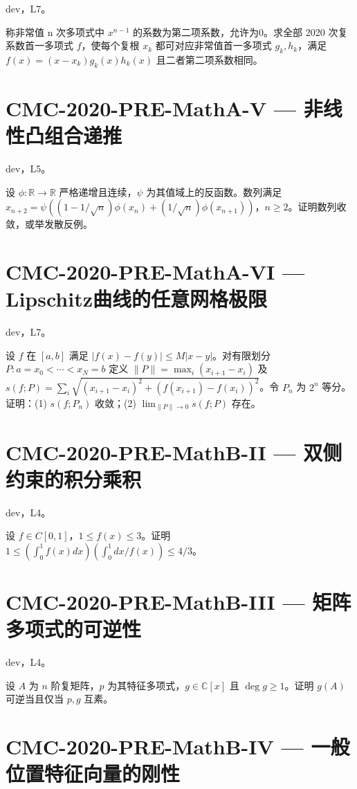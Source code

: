 \documentclass[UTF8]{ctexart}
\begin{document}
dev，L7。

称非常值 n 次多项式中 $x^{n-1}$ 的系数为第二项系数，允许为0。求全部 2020 次复系数首一多项式 $f$，使每个复根 $x_k$ 都可对应非常值首一多项式 $g_k,h_k$，满足 $f(x)=(x-x_k)g_k(x)h_k(x)$ 且二者第二项系数相同。

\section*{CMC-2020-PRE-MathA-V — 非线性凸组合递推}

dev，L5。

设 $\phi:\mathbb R\to\mathbb R$ 严格递增且连续，$\psi$ 为其值域上的反函数。数列满足 $x_{n+2}=\psi((1-1/\sqrt n)\phi(x_n)+(1/\sqrt n)\phi(x_{n+1}))$，$n\ge2$。证明数列收敛，或举发散反例。

\section*{CMC-2020-PRE-MathA-VI — Lipschitz曲线的任意网格极限}

dev，L7。

设 $f$ 在 $[a,b]$ 满足 $|f(x)-f(y)|\le M|x-y|$。对有限划分 $P:a=x_0<\cdots<x_N=b$ 定义 $\|P\|=\max_i(x_{i+1}-x_i)$ 及 $s(f;P)=\sum_i\sqrt{(x_{i+1}-x_i)^2+(f(x_{i+1})-f(x_i))^2}$。令 $P_n$ 为 $2^n$ 等分。证明：(1) $s(f;P_n)$ 收敛；(2) $\lim_{\|P\|\to0}s(f;P)$ 存在。

\section*{CMC-2020-PRE-MathB-II — 双侧约束的积分乘积}

dev，L4。

设 $f\in C[0,1]$，$1\le f(x)\le3$。证明 $1\le(\int_0^1f(x)dx)(\int_0^1dx/f(x))\le4/3$。

\section*{CMC-2020-PRE-MathB-III — 矩阵多项式的可逆性}

dev，L4。

设 $A$ 为 $n$ 阶复矩阵，$p$ 为其特征多项式，$g\in\mathbb C[x]$ 且 $\deg g\ge1$。证明 $g(A)$ 可逆当且仅当 $p,g$ 互素。

\section*{CMC-2020-PRE-MathB-IV — 一般位置特征向量的刚性}
\end{document}
